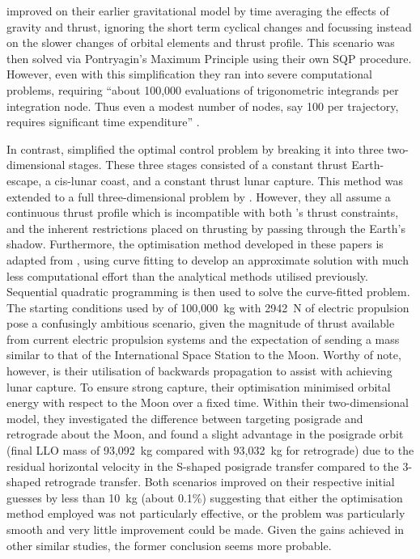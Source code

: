\textcite{Guelman2000} improved on their earlier gravitational model by time averaging the effects of gravity and thrust, ignoring the short term cyclical changes and focussing instead on the slower changes of orbital elements and thrust profile. This scenario was then solved via Pontryagin's Maximum Principle using their own SQP procedure. However, even with this simplification they ran into severe computational problems, requiring \enquote{about 100,000 evaluations of trigonometric integrands per integration node. Thus even a modest number of nodes, say 100 per trajectory, requires significant time expenditure} \parencite[p. 497]{Guelman2000}. 

In contrast, \textcite{Pierson1994} simplified the optimal control problem by breaking it into three two-dimensional stages. These three stages consisted of a constant thrust Earth-escape, a cis-lunar coast, and a constant thrust lunar capture. This method was extended to a full three-dimensional problem by \textcite{Kluever1995,Kluever1996,Kluever1997}. However, they all assume a continuous thrust profile which is incompatible with both \BW's thrust constraints, and the inherent restrictions placed on thrusting by passing through the Earth's shadow. Furthermore, the optimisation method developed in these papers is adapted from \textcite{Edelbaum1964}, using curve fitting to develop an approximate solution with much less computational effort than the analytical methods utilised previously. Sequential quadratic programming is then used to solve the curve-fitted problem. The starting conditions used by \textcite{Pierson1994} of 100,000~kg with 2942~N of electric propulsion pose a confusingly ambitious scenario, given the magnitude of thrust available from current electric propulsion systems and the expectation of sending a mass similar to that of the International Space Station to the Moon. Worthy of note, however, is their utilisation of backwards propagation to assist with achieving lunar capture. To ensure strong capture, their optimisation minimised orbital energy with respect to the Moon over a fixed time. Within their two-dimensional model, they investigated the difference between targeting posigrade and retrograde about the Moon, and found a slight advantage in the posigrade orbit (final LLO mass of 93,092~kg compared with 93,032~kg for retrograde) due to the residual horizontal velocity in the S-shaped posigrade transfer compared to the 3-shaped retrograde transfer. Both scenarios improved on their respective initial guesses by less than 10~kg (about 0.1\%) suggesting that either the optimisation method employed was not particularly effective, or the problem was particularly smooth and very little improvement could be made. Given the gains achieved in other similar studies, the former conclusion seems more probable.

